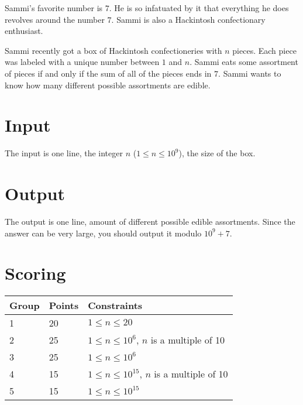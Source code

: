 
Sammi's favorite number is $7$. He is so infatuated by it that everything he does revolves around the number $7$. Sammi is also a Hackintosh confectionary enthusiast.

Sammi recently got a box of Hackintosh confectioneries with $n$ pieces.
Each piece was labeled with a unique number between $1$ and $n$.
Sammi eats some assortment of pieces if and only if the sum of all of the pieces ends in $7$.
Sammi wants to know how many different possible assortments are edible.

\section*{Input}
The input is one line, the integer $n$ ($1 \leq n \leq 10^9$), the size of the box.

\section*{Output}
The output is one line, amount of different possible edible assortments.
Since the answer can be very large, you should output it modulo $10^9+7$.

\section*{Scoring}
\begin{tabular}{|l|l|l|}
\hline
Group & Points & Constraints \\ \hline
1     & 20     & $1 \leq n \leq 20$ \\ \hline
2     & 25     & $1 \leq n \leq 10^6$, $n$ is a multiple of 10 \\ \hline
3     & 25     & $1 \leq n \leq 10^6$ \\ \hline
4     & 15     & $1 \leq n \leq 10^{15}$, $n$ is a multiple of 10 \\ \hline
5     & 15     & $1 \leq n \leq 10^{15}$ \\ \hline
\end{tabular}

